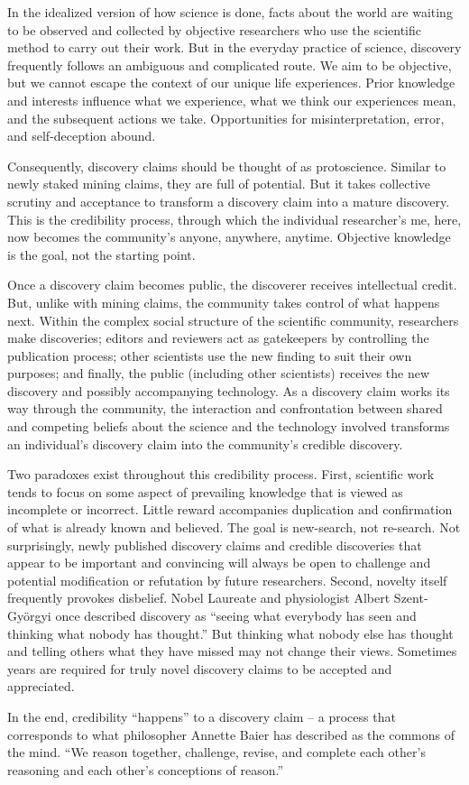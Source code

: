 In the idealized version of how science is done, facts about the world are waiting to be observed and collected by objective researchers who use the scientific method to carry out their work. But in the everyday practice of science, discovery frequently follows an ambiguous and complicated route. We aim to be objective, but we cannot escape the context of our unique life experiences. Prior knowledge and interests influence what we experience, what we think our experiences mean, and the subsequent actions we take. Opportunities for misinterpretation, error, and self-deception abound.


Consequently, discovery claims should be thought of as protoscience. Similar to newly staked mining claims, they are full of potential. But it takes collective scrutiny and acceptance to transform a discovery claim into a mature discovery. This is the credibility process, through which the individual researcher's me, here, now becomes the community's anyone, anywhere, anytime. Objective knowledge is the goal, not the starting point.


Once a discovery claim becomes public, the discoverer receives intellectual credit. But, unlike with mining claims, the community takes control of what happens next. Within the complex social structure of the scientific community, researchers make discoveries; editors and reviewers act as gatekeepers by controlling the publication process; other scientists use the new finding to suit their own purposes; and finally, the public (including other scientists) receives the new discovery and possibly accompanying technology. As a discovery claim works its way through the community, the interaction and confrontation between shared and competing beliefs about the science and the technology involved transforms an individual's discovery claim into the community's credible discovery.


Two paradoxes exist throughout this credibility process. First, scientific work tends to focus on some aspect of prevailing knowledge that is viewed as incomplete or incorrect. Little reward accompanies duplication and confirmation of what is already known and believed. The goal is new-search, not re-search. Not surprisingly, newly published discovery claims and credible discoveries that appear to be important and convincing will always be open to challenge and potential modification or refutation by future researchers. Second, novelty itself frequently provokes disbelief. Nobel Laureate and physiologist Albert Szent-Györgyi once described discovery as ``seeing what everybody has seen and thinking what nobody has thought.'' But thinking what nobody else has thought and telling others what they have missed may not change their views. Sometimes years are required for truly novel discovery claims to be accepted and appreciated.


In the end, credibility ``happens'' to a discovery claim – a process that corresponds to what philosopher Annette Baier has described as the commons of the mind. ``We reason together, challenge, revise, and complete each other's reasoning and each other's conceptions of reason.''


